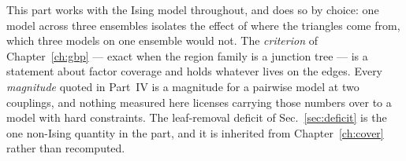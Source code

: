 This part works with the Ising model throughout, and does so by choice: one
model across three ensembles isolates the effect of where the triangles come
from, which three models on one ensemble would not. The \emph{criterion} of
Chapter~\ref{ch:gbp} --- exact when the region family is a junction tree --- is
a statement about factor coverage and holds whatever lives on the edges. Every
\emph{magnitude} quoted in Part~IV is a magnitude for a pairwise model at two
couplings, and nothing measured here licenses carrying those numbers over to a
model with hard constraints. The leaf-removal deficit of
Sec.~\ref{sec:deficit} is the one non-Ising quantity in the part, and it is
inherited from Chapter~\ref{ch:cover} rather than recomputed.
